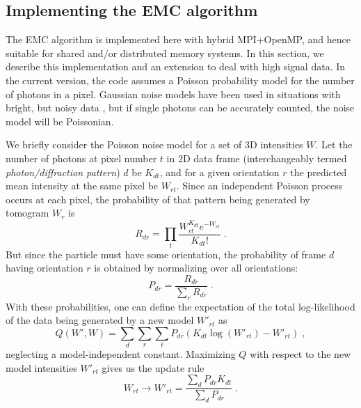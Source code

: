 \documentclass[preprint]{iucr}              %
\begin{document}
\subsection{Implementing the EMC algorithm}\label{subsec:EMC}
The EMC algorithm \cite{loh2009} is implemented here with hybrid MPI+OpenMP, and hence suitable for shared and/or distributed memory systems. In this section, we describe this implementation and an extension to deal with high signal data. In the current version, the code assumes a Poisson probability model for the number of photons in a pixel. 
Gaussian noise models have been used in situations with bright, but noisy data \cite{loh2010,ekeberg2015}, but if single photons can be accurately counted, the noise model will be Poissonian. 

We briefly consider the Poisson noise model for a set of 3D intensities $W$. Let the number of photons at pixel number $t$ in 2D data frame (interchangeably termed {\it photon/diffraction pattern}) $d$ be $K_{dt}$, and for a given orientation $r$ the predicted mean intensity at the same pixel be $W_{rt}$. Since an independent Poisson process occurs at each pixel, the probability of that pattern being generated by tomogram $W_r$ is
\begin{equation}
R_{dr} = \prod_t \frac{W_{rt}^{K_{dt}} e^{-W_{rt}}}{K_{dt}!} \;.
\label{eqn:probnumr}
\end{equation}
But since the particle must have some orientation, the probability of frame $d$ having orientation $r$ is obtained by normalizing over all orientations:
\begin{equation}
P_{dr} = \frac{R_{dr}}{\sum\limits_r R_{dr}}\;.
\label{eqn:prob}
\end{equation}
With these probabilities, one can define the expectation of the total log-likelihood of the data being generated by a new model $W'_{rt}$ as
\begin{equation}
Q(W', W) = \sum_d \sum_r \sum_t P_{dr} (K_{dt} \log(W'_{rt}) - W'_{rt}) \;, 
\label{eqn:totalq}
\end{equation}
neglecting a model-independent constant. Maximizing $Q$ with respect to the new model intensities $W'_{rt}$ gives us the update rule
\begin{equation}
W_{rt} \longrightarrow W'_{rt} = \frac{\sum\limits_d P_{dr} K_{dt}}{\sum\limits_d P_{dr}}\;.
\label{eqn:wupdate}
\end{equation}
\end{document}

